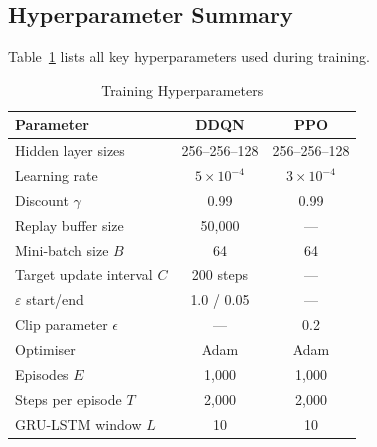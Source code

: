 \subsection{Hyperparameter Summary}

Table~\ref{tab:hyperparams} lists all key hyperparameters used
during training.

\begin{table}[htbp]
\centering
\caption{Training Hyperparameters}
\label{tab:hyperparams}
\renewcommand{\arraystretch}{1.15}
\begin{tabular}{lcc}
\toprule
\textbf{Parameter} & \textbf{DDQN} & \textbf{PPO} \\
\midrule
Hidden layer sizes        & 256--256--128 & 256--256--128 \\
Learning rate             & $5 \times 10^{-4}$ & $3 \times 10^{-4}$ \\
Discount $\gamma$         & 0.99 & 0.99 \\
Replay buffer size        & 50{,}000 & --- \\
Mini-batch size $B$       & 64 & 64 \\
Target update interval $C$& 200 steps & --- \\
$\varepsilon$ start/end   & 1.0 / 0.05 & --- \\
Clip parameter $\epsilon$ & --- & 0.2 \\
Optimiser                 & Adam & Adam \\
Episodes $E$              & 1{,}000 & 1{,}000 \\
Steps per episode $T$     & 2{,}000 & 2{,}000 \\
GRU-LSTM window $L$       & 10 & 10 \\
\bottomrule
\end{tabular}
\end{table}
